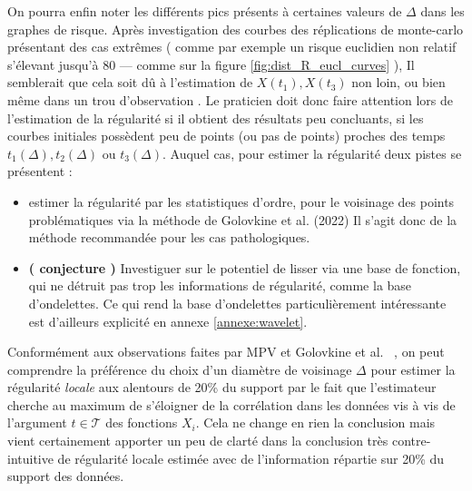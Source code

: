 \bigskip

On pourra enfin noter les différents pics présents à certaines valeurs de $\Delta$ dans les graphes de risque. Après investigation des courbes des réplications de monte-carlo présentant des cas extrêmes ( comme par exemple un risque euclidien non relatif s'élevant jusqu'à 80 — comme sur la figure \ref{fig:dist_R_eucl_curves} ), Il semblerait que cela soit dû à l'estimation de $X(t_1), X(t_3)$ non loin, ou bien même dans un \og trou d'observation \fg. Le praticien doit donc faire attention lors de l'estimation de la régularité si il obtient des résultats peu concluants, si les courbes initiales possèdent peu de points (ou pas de points) proches des temps $t_1(\Delta), t_2(\Delta)$ ou $t_3(\Delta)$. Auquel cas, pour estimer la régularité deux pistes se présentent :

\bigskip

\begin{itemize}
\item estimer la régularité par les statistiques d'ordre, pour le voisinage des points problématiques via la méthode de Golovkine et al. (2022) Il s'agit donc de la méthode recommandée pour les cas pathologiques. 

\bigskip

\item \textbf{( \faExclamationTriangle conjecture )} Investiguer sur le potentiel de lisser via une base de fonction, qui ne détruit pas trop les informations de régularité, comme la base d'ondelettes. Ce qui rend la base d'ondelettes particulièrement intéressante est d'ailleurs explicité en annexe \ref{annexe:wavelet}.
\end{itemize}

\largeskip

\noindent {}

\bigskip

\noindent Conformément aux observations faites par MPV et Golovkine et al. ~\cite{maissoro-SmoothnessFTSweakDep, golovkineRegularityOnlineEstimationNoisyCurve}, on peut comprendre la préférence du choix d'un diamètre de voisinage  $\Delta$ pour estimer la régularité \emph{locale} aux alentours de 20\% du support par le fait que l'estimateur cherche au maximum de s'éloigner de la corrélation dans les données vis à vis de l'argument $t \in \mathcal T$ des fonctions $X_i$. Cela ne change en rien la conclusion mais vient certainement apporter un peu de clarté dans la conclusion très contre-intuitive de régularité locale estimée avec de l'information répartie sur 20\% du support des données.